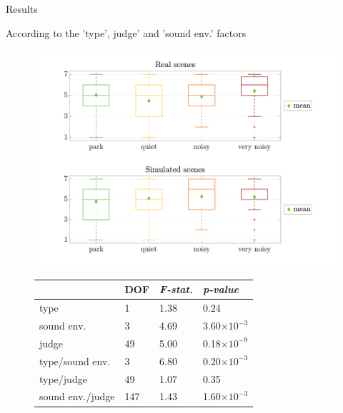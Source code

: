 \documentclass{beamer}
\begin{document}


\begin{frame}{Results}

\begin{block}{According to the 'type', judge' and 'sound env.' factors}
\begin{figure}
\begin{flushleft}

\begin{minipage}[l]{.4\linewidth}		
\includegraphics[width=\textwidth]{pictures/testPerceptif_boxplotAmbianceCOLOR_EN.pdf}
\end{minipage}%
\begin{minipage}[r]{.5\linewidth}
\footnotesize
\begin{tabular}{p{2.35cm}p{0.5cm}p{0.95cm}p{1.65cm}}
        &  DOF &  \textit{F-stat.}    &  \textit{p-value} \\ 
\hline
 type &  1 &  1.38 &  0.24   \\
\hline
 sound env.   &  3 &  4.69 &  3.60$\times 10^{-3}$  \\ 
\hline
 judge   &  49 &  5.00 &  0.18$\times 10^{-9}$  \\ 
\hline
 type/sound env. &  3 &  6.80 &  0.20$\times 10^{-3}$\\
\hline
 type/judge &  49 &   1.07 &   0.35\\
\hline
 sound env./judge &  147 &  1.43 &  1.60$\times 10^{-3}$\\
\end{tabular}
\label{tab:p_value_type_ambience}
\end{minipage}
\end{flushleft}
\end{figure}
\end{block}



\end{frame}
\end{document}
